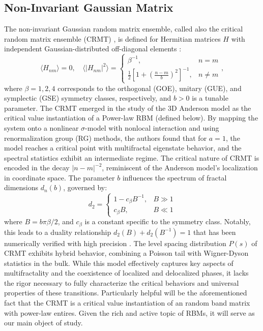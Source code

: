 \documentclass[11pt]{article}
\begin{document}
\subsection*{Non-Invariant Gaussian Matrix}
The non-invariant Gaussian random matrix ensemble, called also the critical random matrix ensemble (CRMT) \cite{mirlin1996}, is defined for Hermitian matrices \( H \) with independent Gaussian-distributed off-diagonal elements \cite{kravtsov2009}:$$
\langle H_{nm} \rangle = 0, \quad \langle |H_{nm}|^2 \rangle = 
\begin{cases} 
\beta^{-1}, & n = m \\ 
\frac{1}{2} \left[ 1 + \left( \frac{n - m}{b} \right)^2 \right]^{-1}, & n \neq m 
\end{cases}
,$$
where \( \beta = 1, 2, 4 \) corresponds to the orthogonal (GOE), unitary (GUE), and symplectic (GSE) symmetry classes, respectively, and \( b > 0 \) is a tunable parameter. The CRMT emerged in the study of the 3D Anderson model as the critical value  instantiation of a Power-law RBM (defined below). By mapping the system onto a nonlinear $\sigma$-model with nonlocal interaction and using renormalization group (RG) methods, the authors found that for $a = 1$, the model reaches a critical point with multifractal eigenstate behavior, and the spectral statistics exhibit an intermediate regime. The critical nature of CRMT is encoded in the decay \( |n - m|^{-2} \), reminiscent of the Anderson model's localization in coordinate space. The parameter \( b \) influences the spectrum of fractal dimensions \( d_n(b) \), governed by:
\[
d_2 = 
\begin{cases} 
1 - c_\beta B^{-1}, & B \gg 1 \\ 
c_\beta B, & B \ll 1 
\end{cases}
\]
where \( B = b \pi \beta/2 \), and \( c_\beta \) is a constant specific to the symmetry class. Notably, this leads to a duality relationship \( d_2(B) + d_2(B^{-1}) = 1 \) that has been numerically verified with high precision \cite{kravtsov2009}. The level spacing distribution \( P(s) \) of CRMT exhibits hybrid behavior, combining a Poisson tail with Wigner-Dyson statistics in the bulk. While this model effectively captures key aspects of multifractality and the coexistence of localized and delocalized phases, it lacks the rigor necessary to fully characterize the critical behaviors and universal properties of these transitions. Particularly helpful will be the aforementioned fact that the CRMT is a critical value instantiation of an random band matrix with power-law entires. Given the rich and active topic of RBMs, it will serve as our main object of study.  
\end{document}
